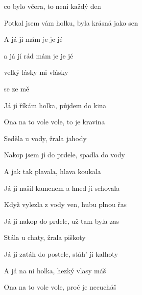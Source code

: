 

\zs
{} co bylo včera, to není každý den

Potkal jsem vám holku, byla krásná jako sen
\ks

\zr
A já ji  mám je je jé

a já jí  rád mám je je jé

 velký lásky  mi vlásky

 se ze mě 
\kr

\zr \kr

\zs
Já jí říkám holka, půjdem do kina

Ona na to vole vole, to je kravina
\ks

\zr \kr

\zs
Seděla u vody, žrala jahody

Nakop jsem jí do prdele, spadla do vody
\ks

\zr \kr

\zs
A jak tak plavala, hlava koukala

Já ji našil kamenem a hned ji schovala
\ks

\zr \kr

\zs
Když vylezla z vody ven, hubu plnou řas

Já ji nakop do prdele, už tam byla zas
\ks

\zr \kr

\zs
Stála u chaty, žrala piškoty

Já ji zatáh do postele, stáh' jí kalhoty
\ks

\zr \kr

\zs
A já na ni holka, hezký vlasy máš

Ona na to vole vole, proč je necucháš
\ks

\zr \kr

\kp





